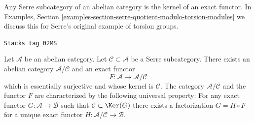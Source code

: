 Any Serre subcategory of an abelian category is the kernel of
an exact functor. In
Examples, Section \ref{examples-section-serre-quotient-modulo-torsion-modules}
we discuss this for Serre's original example of torsion groups.

\begin{lemma}
\label{homology-lemma-serre-subcategory-is-kernel}
\href{https://stacks.math.columbia.edu/tag/02MS}{\texttt{Stacks tag 02MS}}

Let $\mathcal{A}$ be an abelian category.
Let $\mathcal{C} \subset \mathcal{A}$ be a Serre subcategory.
There exists an abelian category $\mathcal{A}/\mathcal{C}$
and an exact functor
$$
F : \mathcal{A} \longrightarrow \mathcal{A}/\mathcal{C}
$$
which is essentially surjective and whose kernel is $\mathcal{C}$.
The category $\mathcal{A}/\mathcal{C}$ and the functor $F$ are
characterized by the following universal property: For any exact
functor $G : \mathcal{A} \to \mathcal{B}$ such that
$\mathcal{C} \subset \Ker(G)$ there exists a factorization
$G = H \circ F$ for a unique exact functor
$H : \mathcal{A}/\mathcal{C} \to \mathcal{B}$.
\end{lemma}

